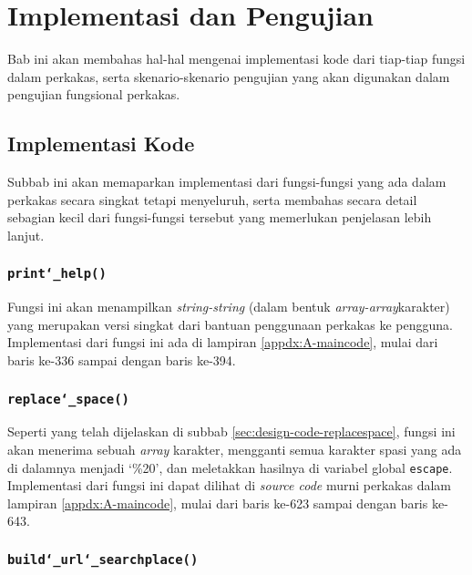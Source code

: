 \chapter{Implementasi dan Pengujian}
\label{chap:testing}

Bab ini akan membahas hal-hal mengenai implementasi kode dari tiap-tiap fungsi dalam perkakas, serta skenario-skenario pengujian yang akan digunakan dalam pengujian fungsional perkakas.

\section{Implementasi Kode}
\label{sec:testing-implementation}

Subbab ini akan memaparkan implementasi dari fungsi-fungsi yang ada dalam perkakas secara singkat tetapi menyeluruh, serta membahas secara detail sebagian kecil dari fungsi-fungsi tersebut yang memerlukan penjelasan lebih lanjut.

\subsection{\texttt{print\char`_help()}}
\label{sec:testing-implementation-printhelp}

Fungsi ini akan menampilkan \textit{string-string} (dalam bentuk \textit{array-array}karakter) yang merupakan versi singkat dari bantuan penggunaan perkakas ke pengguna. Implementasi dari fungsi ini ada di lampiran \ref{appdx:A-maincode}, mulai dari baris ke-336 sampai dengan baris ke-394.

\subsection{\texttt{replace\char`_space()}}
\label{sec:testing-implementation-replacespace}

Seperti yang telah dijelaskan di subbab \ref{sec:design-code-replacespace}, fungsi ini akan menerima sebuah \textit{array} karakter, mengganti semua karakter spasi yang ada di dalamnya menjadi `\%20', dan meletakkan hasilnya di variabel global \verb|escape|. Implementasi dari fungsi ini dapat dilihat di \textit{source code} murni perkakas dalam lampiran \ref{appdx:A-maincode}, mulai dari baris ke-623 sampai dengan baris ke-643.

\subsection{\texttt{build\char`_url\char`_searchplace()}}
\label{sec:testing-implementation-buildurl-searchplace}


